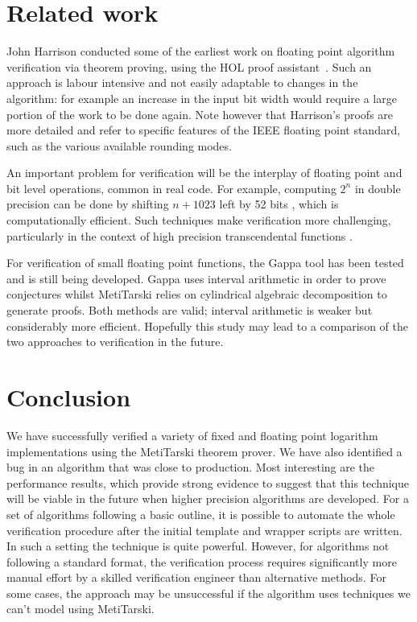 \section{Related work}
\label{Related}
John Harrison conducted some of the earliest work on floating point algorithm verification via theorem proving, using the HOL proof assistant~\cite{harrison1997floating}. Such an approach is labour intensive and not easily adaptable to changes in the algorithm: for example an increase in the input bit width would require a large portion of the work to be done again. Note however that Harrison's proofs are more detailed and refer to specific features of the IEEE floating point standard, such as the various available rounding modes. 

An important problem for verification will be the interplay of floating point and bit level operations, common in real code. For example, computing $2^n$ in double precision can be done by shifting $n+1023$ left by 52 bits \cite{mine2012abstract}, which is computationally efficient. Such techniques make verification more challenging, particularly in the context of high precision transcendental functions \cite{lee2016verifying}. 

For verification of small floating point functions, the Gappa tool \cite{de2006assisted,boldo2009combining} has been tested and is still being developed. Gappa uses interval arithmetic in order to prove conjectures whilst MetiTarski relies on cylindrical algebraic decomposition to generate proofs. Both methods are valid; interval arithmetic is weaker but considerably more efficient. Hopefully this study may lead to a comparison of the two approaches to verification in the future.

\section{Conclusion}
\label{Conclusion}
We have successfully verified a variety of fixed and floating point logarithm implementations using the MetiTarski theorem prover.
We have also identified a bug in an algorithm that was close to production. Most interesting are the performance results, which provide strong evidence to suggest that this technique will be viable in the future when higher precision algorithms are developed. For a set of algorithms following a basic outline, it is possible to automate the whole verification procedure after the initial template and wrapper scripts are written. In such a setting the technique is quite powerful. However, for algorithms not following a standard format, the verification process requires significantly more manual effort by a skilled verification engineer than alternative methods. For some cases, the approach may be unsuccessful if the algorithm uses techniques we can't model using MetiTarski. 

